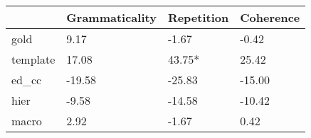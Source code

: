 \begin{tabular}{llll}
\toprule
 & Grammaticality & Repetition & Coherence \\
\midrule
gold & 9.17 & -1.67 & -0.42 \\
template & 17.08 & 43.75* & 25.42 \\
ed_cc & -19.58 & -25.83 & -15.00 \\
hier & -9.58 & -14.58 & -10.42 \\
macro & 2.92 & -1.67 & 0.42 \\
\bottomrule
\end{tabular}
